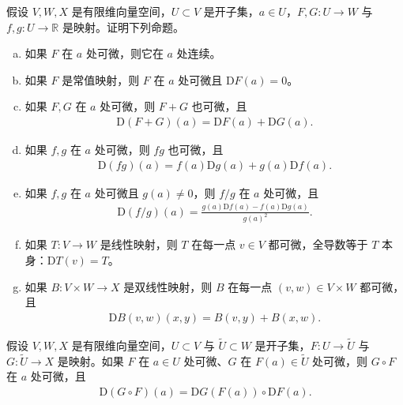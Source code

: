 \documentclass[../../main.tex]{subfiles}
\begin{document}
\begin{exercise}\label{exercise:appC-C-2}
假设 $V,W,X$ 是有限维向量空间，$U\subset V$ 是开子集，$a\in U$，$F,G:U\to W$ 与 $f,g:U\to\mathbb R$ 是映射。证明下列命题。
\begin{enumerate}[(a)]
\item 如果 $F$ 在 $a$ 处可微，则它在 $a$ 处连续。
\item 如果 $F$ 是常值映射，则 $F$ 在 $a$ 处可微且 $\mathrm{D}F(a)=0$。
\item 如果 $F,G$ 在 $a$ 处可微，则 $F+G$ 也可微，且
\begin{align*}
\mathrm{D}(F+G)(a)=\mathrm{D}F(a)+\mathrm{D}G(a).
\end{align*}
\item 如果 $f,g$ 在 $a$ 处可微，则 $fg$ 也可微，且
\begin{align*}
\mathrm{D}(fg)(a)=f(a)\mathrm{D}g(a)+g(a)\mathrm{D}f(a).
\end{align*}
\item 如果 $f,g$ 在 $a$ 处可微且 $g(a)\neq0$，则 $f/g$ 在 $a$ 处可微，且
\begin{align*}
\mathrm{D}(f/g)(a)=\frac{g(a)\mathrm{D}f(a)-f(a)\mathrm{D}g(a)}{g(a)^2}.
\end{align*}
\item 如果 $T:V\to W$ 是线性映射，则 $T$ 在每一点 $v\in V$ 都可微，全导数等于 $T$ 本身：$\mathrm{D}T(v)=T$。
\item 如果 $B:V\times W\to X$ 是双线性映射，则 $B$ 在每一点 $(v,w)\in V\times W$ 都可微，且
\begin{align*}
\mathrm{D}B(v,w)(x,y)=B(v,y)+B(x,w).
\end{align*}
\end{enumerate}
\end{exercise}

\begin{proposition}[全导数的链式法则]\label{proposition:appC-chain-rule}
假设 $V,W,X$ 是有限维向量空间，$U\subset V$ 与 $\widetilde U\subset W$ 是开子集，$F:U\to\widetilde U$ 与 $G:\widetilde U\to X$ 是映射。如果 $F$ 在 $a\in U$ 处可微、$G$ 在 $F(a)\in\widetilde U$ 处可微，则 $G\circ F$ 在 $a$ 处可微，且
\begin{align*}
\mathrm{D}(G\circ F)(a)=\mathrm{D}G(F(a))\circ\mathrm{D}F(a).
\end{align*}
\end{proposition}
\end{document}
